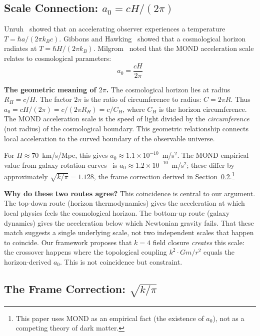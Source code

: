 \documentclass[aps,prd,preprint,superscriptaddress,showpacs,preprintnumbers,amsmath,amssymb,nofootinbib]{revtex4-2}
\begin{document}
\subsection{Scale Connection: \texorpdfstring{$a_0 = cH/(2\pi)$}{a₀ = cH/(2π)}}
\label{subsec:scale}

Unruh~\cite{unruh1976} showed that an accelerating observer experiences a temperature $T = \hbar a/(2\pi k_B c)$. Gibbons and Hawking~\cite{gibbons1977} showed that a cosmological horizon radiates at $T = \hbar H/(2\pi k_B)$. Milgrom~\cite{milgrom1983} noted that the MOND acceleration scale relates to cosmological parameters:
\begin{equation}
a_0 = \frac{cH}{2\pi}
\label{eq:mond}
\end{equation}

\textbf{The geometric meaning of $2\pi$.} The cosmological horizon lies at radius $R_H = c/H$. The factor $2\pi$ is the ratio of circumference to radius: $C = 2\pi R$. Thus $a_0 = cH/(2\pi) = c/(2\pi R_H) = c/C_H$, where $C_H$ is the horizon circumference. The MOND acceleration scale is the speed of light divided by the \emph{circumference} (not radius) of the cosmological boundary. This geometric relationship connects local acceleration to the curved boundary of the observable universe.

For $H \approx 70$~km/s/Mpc, this gives $a_0 \approx 1.1 \times 10^{-10}$~m/s$^2$. The MOND empirical value from galaxy rotation curves~\cite{milgrom1983} is $a_0 \approx 1.2 \times 10^{-10}$~m/s$^2$; these differ by approximately $\sqrt{k/\pi} = 1.128$, the frame correction derived in Section~\ref{subsec:ratio}.\footnote{This paper uses MOND as an empirical fact (the existence of $a_0$), not as a competing theory of dark matter.}

\textbf{Why do these two routes agree?} This coincidence is central to our argument. The top-down route (horizon thermodynamics) gives the acceleration at which local physics feels the cosmological horizon. The bottom-up route (galaxy dynamics) gives the acceleration below which Newtonian gravity fails. That these match suggests a single underlying scale, not two independent scales that happen to coincide. Our framework proposes that $k=4$ field closure \emph{creates} this scale: the crossover happens where the topological coupling $k^2 \cdot Gm/r^2$ equals the horizon-derived $a_0$. This is not coincidence but constraint.

\subsection{The Frame Correction: \texorpdfstring{$\sqrt{k/\pi}$}{√(k/π)}}
\label{subsec:ratio}
\end{document}
